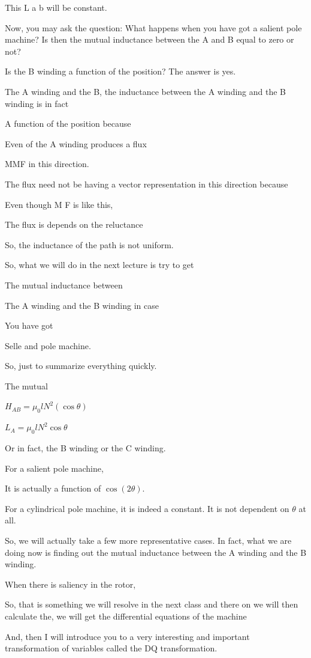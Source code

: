 \documentclass{article}
\begin{document}
This L a b will be constant.

Now, you may ask the question: What happens when you have got a salient pole machine? Is then the mutual inductance between the A and B equal to zero or not?

Is the B winding a function of the position? The answer is yes.

The A winding and the B, the inductance between the A winding and the B winding is in fact

A function of the position because

Even of the A winding produces a flux

MMF in this direction.

The flux need not be having a vector representation in this direction because

Even though M F is like this,

The flux is depends on the reluctance

So, the inductance of the path is not uniform.

So, what we will do in the next lecture is try to get

The mutual inductance between

The A winding and the B winding in case

You have got

Selle and pole machine.

So, just to summarize everything quickly.

The mutual

$H_{AB} = \mu_0 l N^2 (\cos\theta)$



$L_A = \mu_0 l N^2 \cos\theta$

Or in fact, the B winding or the C winding.

For a salient pole machine,

It is actually a function of $\cos(2\theta)$.

For a cylindrical pole machine, it is indeed a constant. It is not dependent on $\theta$ at all.

So, we will actually take a few more representative cases. In fact, what we are doing now is finding out the mutual inductance between the A winding and the B winding.

When there is saliency in the rotor,

So, that is something we will resolve in the next class and there on we will then calculate the, we will get the differential equations of the machine

And, then I will introduce you to a very interesting and important transformation of variables called the DQ transformation.



\end{document}
